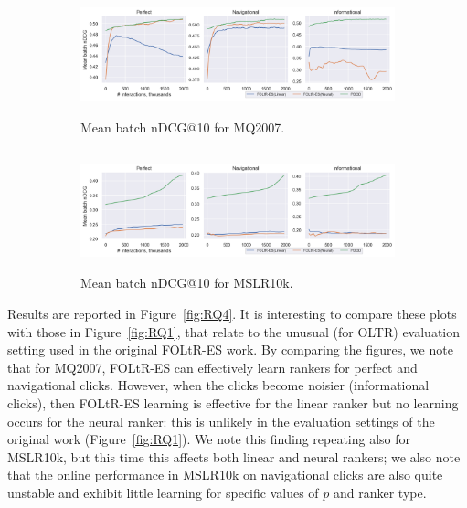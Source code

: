 \begin{figure}[t]
	\centering
	\begin{subfigure}{1\textwidth}
		\includegraphics[width=13cm, height=3.5cm]{images/RQ4/mq2007_foltr_PDGD_offline nDCG_c2000_p1.0.png}
		\caption{Mean batch nDCG@10 for MQ2007.}
		\label{fig:mq2007-rq4-offline}
	\end{subfigure}
	\begin{subfigure}{1\textwidth}
		\includegraphics[width=13cm, height=3.5cm]{images/RQ4/mslr10k_foltr_PDGD_offline nDCG_c2000_p1.0.png}
		\caption{Mean batch nDCG@10 for MSLR10k.}
		\label{fig:mslr10k-rq4-offline}
	\end{subfigure}
	\caption{{\color{red}{Results for RQ4: performance of FOLtR-ES and PDGD in terms of offline nDCG@10 with privatization parameter $p=1$ and 2,000 clients (averaged across all dataset splits).}} \label{fig:RQ4-offline}} 
\end{figure}

Results are reported in Figure~\ref{fig:RQ4}. It is interesting to compare these plots with those in Figure~\ref{fig:RQ1}, that relate to the unusual (for OLTR) evaluation setting used in the original FOLtR-ES work. By comparing the figures, we note that for MQ2007, FOLtR-ES can effectively learn rankers for perfect and navigational clicks. However, when the clicks become noisier (informational clicks), then FOLtR-ES learning is effective for the linear ranker but no learning occurs for the neural ranker: this is unlikely in the evaluation settings of the original work (Figure~\ref{fig:RQ1}). We note this finding repeating also for MSLR10k, but this time this affects both linear and neural rankers; we also note that the online performance in MSLR10k on navigational clicks are also quite unstable and exhibit little learning for specific values of $p$ and ranker type. {\color{red}{The online performance in MSLR10k on informational clicks (the noisiest clicks) even shows a decreasing trend as the interactions grow.}}

